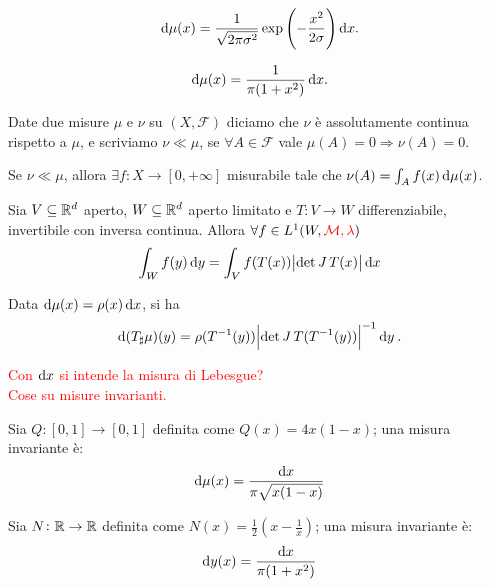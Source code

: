 \begin{example}[Gaussiana su $ \R $]
    \[ \dif\mu(x) = \frac{1}{\sqrt{2\pi\sigma^2}} \exp{\left (-\frac{x^2}{2\sigma}\right )} \dif x. \]
\end{example}

\begin{example}
    \[ \dif\mu(x) = \frac{1}{\pi(1+x^2)}\dif x. \]
\end{example}

\begin{definition}
    Date due misure $ \mu $ e $ \nu $ su $ (X, \mathcal{F}) $ diciamo che $ \nu $ è assolutamente continua rispetto a $ \mu $, e scriviamo $ \nu \ll \mu $, se $ \forall A \in \mathcal{F} $ vale $ \mu(A) = 0 \Rightarrow \nu(A) = 0$.
\end{definition}
\begin{thm}
    Se $ \nu \ll \mu $, allora $ \exists f\colon X\to [0,+\infty] $ misurabile tale che $ \nu(A) = \int_A f(x)\dif\mu(x) $.
\end{thm}

\begin{thm}
    Sia $ V \subseteq\mathbb{R}^d $ aperto, $ W\subseteq\mathbb{R}^d $ aperto limitato e $ T\colon V \to W $ differenziabile, invertibile con inversa continua. Allora $ \forall f\in L^1(W, \textcolor{red}{\mathcal{M}, \lambda}) $
    \[ \int_W f(y)\dif y = \int_V f(T(x)) \abs{\det{\jac{T}(x)}} \dif x \]
\end{thm}
\begin{oss}
    Data $ \dif\mu(x) = \rho(x)\dif x $, si ha 
    \begin{equation}\label{eq:pushforward-misure}
        \dif{(T_\sharp\mu)(y)} = \rho(T^{-1}(y)) \abs{\det{\jac T}(T^{-1}(y))}^{-1} \dif y \: .
    \end{equation}
\end{oss}

\textcolor{red}{Con $ \dif{x} $ si intende la misura di Lebesgue?} \\

\textcolor{red}{Cose su misure invarianti.}

\begin{exercise}
    Sia $ Q\colon [0,1] \to [0,1] $ definita come $ Q(x) = 4x(1-x) $; una misura invariante è:
    \[ \dif\mu(x) = \frac{\dif x}{\pi\sqrt{x(1-x)}} \]
\end{exercise}
\begin{exercise}
    Sia $ N\colon \mathbb{R}\to\mathbb{R} $ definita come $ N(x) = \frac{1}{2} \left( x-\frac{1}{x} \right) $; una misura invariante è:
    \[ \dif y(x) = \frac{\dif x}{\pi(1+x^2)} \]
\end{exercise}
